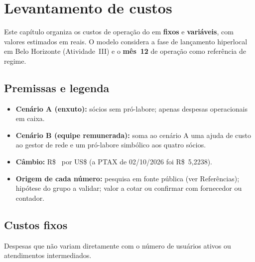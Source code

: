 \section{Levantamento de custos}
\label{sec:custos}

Este capítulo organiza os custos de operação do \projeto{} em \textbf{fixos} e \textbf{variáveis},
com valores estimados em reais. O modelo considera a fase de lançamento hiperlocal em Belo
Horizonte (Atividade~III) e o \textbf{mês~12} de operação como referência de regime.

\subsection{Premissas e legenda}

\begin{itemize}
  \item \textbf{Cenário A (enxuto):} sócios sem pró-labore; apenas despesas operacionais em caixa.
  \item \textbf{Cenário B (equipe remunerada):} soma ao cenário A uma ajuda de custo ao gestor de
  rede e um pró-labore simbólico aos quatro sócios.
  \item \textbf{Câmbio:} R\$~\cambio{} por US\$ (a PTAX de 02/10/2026 foi R\$~5,2238).
  \item \textbf{Origem de cada número:} \bP{} pesquisa em fonte pública (ver Referências);
  \bH{} hipótese do grupo a validar; \bC{} valor a cotar ou confirmar com fornecedor ou contador.
\end{itemize}

\subsection{Custos fixos}
\label{sec:custos-fixos}

Despesas que não variam diretamente com o número de usuários ativos ou atendimentos intermediados.

